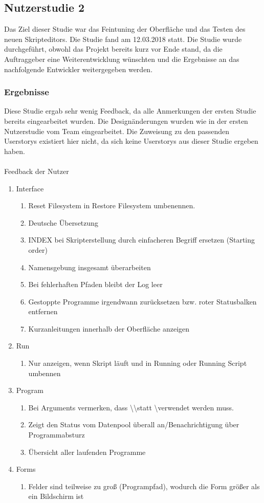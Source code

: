 \subsection{Nutzerstudie 2}
Das Ziel dieser Studie war das Feintuning der Oberfläche und das Testen des neuen
Skripteditors. Die Studie fand am 12.03.2018 statt. Die Studie wurde durchgeführt,
obwohl das Projekt bereits kurz vor Ende stand, da die Auftraggeber eine
Weiterentwicklung wünschten und die Ergebnisse an das nachfolgende Entwickler
weitergegeben werden.


\subsubsection{Ergebnisse}
Diese Studie ergab sehr wenig Feedback, da alle Anmerkungen der ersten Studie bereits
eingearbeitet wurden. Die Designänderungen wurden wie in der ersten Nutzerstudie
vom Team eingearbeitet. Die Zuweisung zu den passenden Userstorys existiert hier nicht,
da sich keine Userstorys aus dieser Studie ergeben haben.
\\\\
{\large Feedback der Nutzer\\}
\begin{enumerate}
\item Interface
\begin{enumerate}
	\item Reset Filesystem in Restore Filesystem umbenennen.
	\item Deutsche Übersetzung
	\item INDEX bei Skripterstellung durch einfacheren Begriff ersetzen (Starting order)
	\item Namensgebung insgesamt überarbeiten
	\item Bei fehlerhaften Pfaden bleibt der Log leer
	\item Gestoppte Programme irgendwann zurücksetzen bzw. roter Statusbalken entfernen
	\item Kurzanleitungen innerhalb der Oberfläche anzeigen
\end{enumerate}
\item Run
\begin{enumerate}
	\item Nur anzeigen, wenn Skript läuft und in Running oder Running Script umbennen
\end{enumerate}
\item Program
\begin{enumerate}
	\item Bei Arguments vermerken, dass \textbackslash\textbackslash statt \textbackslash verwendet werden muss.
	\item Zeigt den Status vom Datenpool überall an/Benachrichtigung über Programmabsturz
	\item Übersicht aller laufenden Programme
\end{enumerate}
\item Forms
\begin{enumerate}
		\item Felder sind teilweise zu groß (Programpfad), wodurch die Form größer als ein Bildschirm ist
\end{enumerate}
\end{enumerate}
